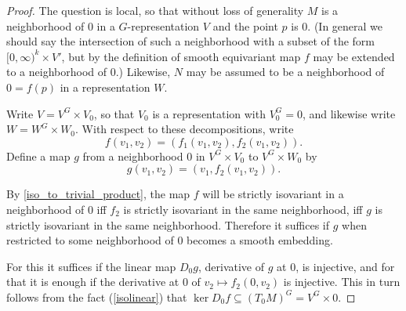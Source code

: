 \documentclass[11pt]{amsart}
\theoremstyle{definition}
\numberwithin{equation}{section}
\numberwithin{figure}{section}
\begin{document}
\begin{proof}
The question is local, so that without loss of generality $M$ is a neighborhood of $0$ in a $G$-representation $V$ and the point $p$ is $0$. (In general we should say the intersection of such a neighborhood with a subset of the form $[0,\infty)^k \times V'$, but by the definition of smooth equivariant map $f$ may be extended to a neighborhood of $0$.) Likewise, $N$ may be assumed to be a neighborhood of $0=f(p)$ in a representation $W$.


Write $V=V^G\times V_0$, so that $V_0$ is a representation with $V_0^G=0$, and likewise write $W=W^G\times W_0$. With respect to these decompositions, write 
$$f(v_1, v_2)= (f_1(v_1, v_2), f_2(v_1, v_2)).$$ 
Define a map $g$ from a neighborhood $0$ in $V^G\times V_0$ to $V^G\times  W_0$ by 
$$
g(v_1,v_2)=(v_1,f_2(v_1,v_2)).
$$

By \autoref{iso_to_trivial_product}, the map $f$ will be strictly isovariant in a neighborhood of $0$ iff $f_2$ is strictly isovariant in the same neighborhood, iff $g$ is strictly isovariant in the same neighborhood. Therefore it suffices if $g$ when restricted to some neighborhood of $0$ becomes a smooth embedding. %

For this it suffices if the linear map $D_0g$, derivative of $g$ at $0$, is injective, and for that it is enough if the derivative at $0$ of $v_2\mapsto f_2(0,v_2)$ is injective. This in turn follows from the fact (\autoref{isolinear}) that $\ker D_0f\subseteq (T_0M)^G=V^G\times 0$. 
\end{proof}
\end{document}
